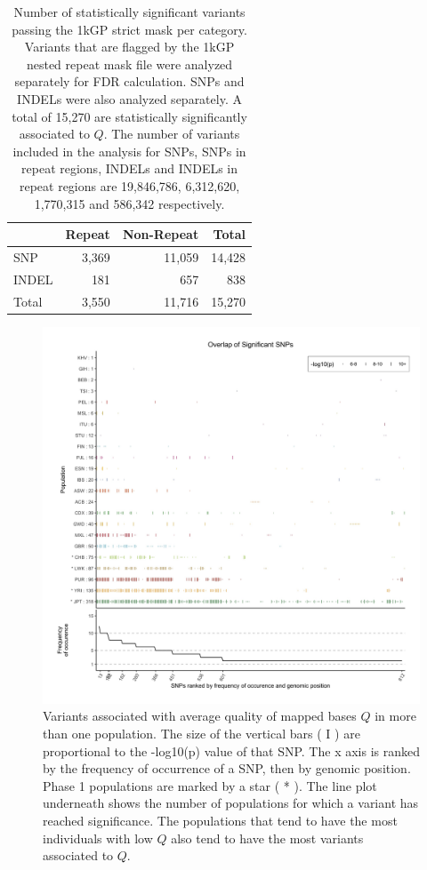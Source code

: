 \documentclass[9pt,lineno]{template}
\begin{document}
\begin{table}
\centering
\begin{tabular}{l  r r r}
                      & {Repeat}  & {Non-Repeat}   & {Total}    \\ \hline
{SNP}  & 3,369 & 11,059 & 14,428\\  
{INDEL} & 181 & 657 & 838\\ \hline
{Total} & 3,550 & 11,716 & 15,270\\
\end{tabular}
\caption{Number of statistically significant variants  passing the 1kGP strict mask per category. 
Variants that are flagged by the 1kGP nested repeat mask file were analyzed separately for FDR calculation. SNPs and INDELs were also analyzed separately.
A total of 15,270 are statistically significantly associated to $Q$. 
The number of variants included in the analysis for SNPs, SNPs in repeat regions, INDELs and INDELs in repeat regions are  19,846,786, 6,312,620, 1,770,315 and 586,342 respectively.}
\label{sigTable}
\end{table}

\begin{figure}
\includegraphics[width=\hsize,keepaspectratio]{../Figures/SNPOverlap6.jpg}

\caption{Variants associated with average quality of mapped bases $Q$ in more than one population.
The size of the vertical bars ( I ) are proportional to the -log10(p) value of that SNP.
The x axis is ranked by the frequency of occurrence of a SNP, then by genomic position.
Phase 1 populations are marked by a star ( * ).
The line plot underneath shows the number of populations for which a variant has reached significance.
The populations that tend to have the most individuals with low $Q$ also tend to have the most variants associated to $Q$.}
  \label{OverLap}
\end{figure}
\end{document}
